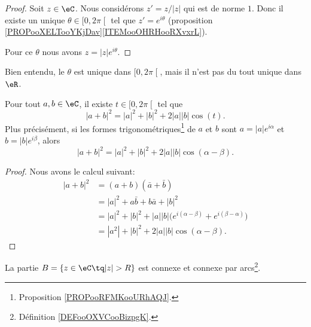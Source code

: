 \begin{proof}
	Soit \( z\in \eC\). Nous considérons \( z'=z/| z |\) qui est de norme \( 1\). Donc il existe un unique \( \theta\in\mathopen[ 0 , 2\pi \mathclose[\) tel que \( z'= e^{i\theta}\) (proposition \ref{PROPooXELTooYKjDav}\ref{ITEMooOHRHooRXvxrL}).

	Pour ce \( \theta\) nous avons \( z=| z | e^{i\theta}\).
\end{proof}
Bien entendu, le \( \theta\) est unique dans \( \mathopen[ 0 , 2\pi \mathclose[\), mais il n'est pas du tout unique dans \( \eR\).


\begin{lemma}        \label{LEMooOQKNooGZlJHf}
	Pour tout \( a,b\in \eC\), il existe \( t\in \mathopen[ 0 , 2\pi \mathclose[\) tel que
	\begin{equation}
		| a+b |^2=| a |^2+| b |^2+2| a || b |\cos(t).
	\end{equation}
	Plus précisément, si les formes trigonométriques\footnote{Proposition \ref{PROPooRFMKooURhAQJ}.} de \( a\) et \( b\) sont \( a=| a | e^{i\alpha}\) et \( b=| b | e^{i\beta}\), alors
	\begin{equation}
		| a+b |^2=| a |^2+| b |^2+2| a || b |\cos(\alpha-\beta).
	\end{equation}
\end{lemma}

\begin{proof}
	Nous avons le calcul suivant:
	\begin{subequations}
		\begin{align}
			| a+b |^2 & =(a+b)(\bar a+\bar b)                                                            \\
			          & =| a |^2+a\bar b+b\bar a+| b |^2                                                 \\
			          & =| a |^2+| b |^2+| a | |b |\big(  e^{i(\alpha-\beta)}+ e^{i(\beta-\alpha)} \big) \\
			          & =| a^2 |+| b |^2+2| a | |b |\cos(\alpha-\beta).
		\end{align}
	\end{subequations}
\end{proof}

\begin{corollary}		\label{CORooONAVooKPhQuI}
	La partie \( B=\{ z\in \eC\tq | z |>R \}\) est connexe et connexe par arcs\footnote{Définition \ref{DEFooOXVCooBizpgK}.}.
\end{corollary}

